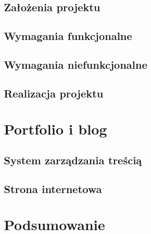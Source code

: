 \documentclass[12pt]{article}
\numberwithin{figure}{section}
\begin{document}
\begin{sloppypar}

\subsection{Założenia projektu}


\subsection{Wymagania funkcjonalne}


\subsection{Wymagania niefunkcjonalne}



\subsection{Realizacja projektu}


\newpage

\section{Portfolio i blog}


\subsection{System zarządzania treścią}


\subsection{Strona internetowa}


\section{Podsumowanie}


%
    \listoffigures
    \clearpage


\end{sloppypar}
\end{document}
